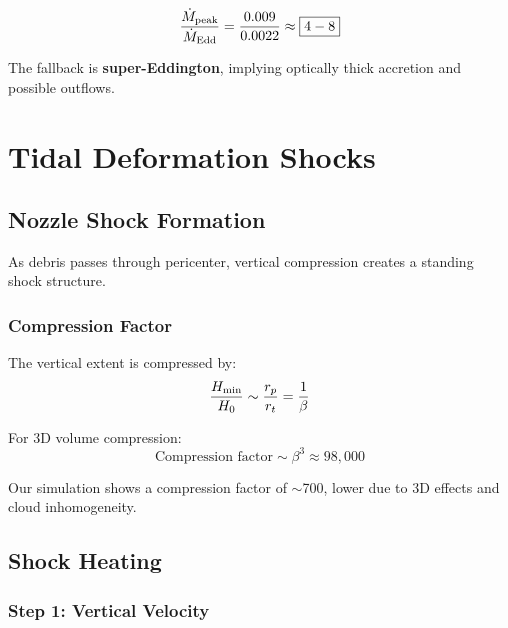 \documentclass[twocolumn,amsmath,amssymb,prd,superscriptaddress,nofootinbib]{revtex4-2}
\begin{document}
\begin{equation}
    \frac{\dot{M}_{\rm peak}}{\dot{M}_{\rm Edd}} = \frac{0.009}{0.0022} \approx \boxed{4-8}
\end{equation}

The fallback is \textbf{super-Eddington}, implying optically thick accretion and possible outflows.

\section{Tidal Deformation Shocks}
\label{sec:shocks}

\subsection{Nozzle Shock Formation}
\label{sec:nozzle}

As debris passes through pericenter, vertical compression creates a standing shock structure.

\subsubsection{Compression Factor}

The vertical extent is compressed by:
\begin{equation}
    \frac{H_{\rm min}}{H_0} \sim \frac{r_p}{r_t} = \frac{1}{\beta}
    \label{eq:compression}
\end{equation}

For 3D volume compression:
\begin{equation}
    \text{Compression factor} \sim \beta^3 \approx 98,000
\end{equation}

Our simulation shows a compression factor of $\sim$700, lower due to 3D effects and cloud inhomogeneity.

\subsection{Shock Heating}
\label{sec:shock_heating}

\subsubsection{Step 1: Vertical Velocity}
\end{document}
